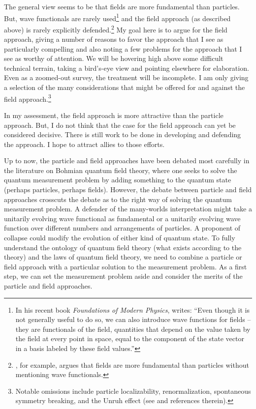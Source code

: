 \documentclass[12pt,onecolumn,secnumarabic,amsmath,amssymb,balancelastpage,nofootinbib]{article}
\begin{document}
The general view seems to be that fields are more fundamental than particles.  But, wave functionals are rarely used\footnote{In his recent book \emph{Foundations of Modern Physics}, \citet[pg.\ 251--252]{weinberg2021} writes: ``Even though it is not generally useful to do so, we can also introduce wave functions for fields -- they are functionals of the field, quantities that depend on the value taken by the field at every point in space, equal to the component of the state vector in a basis labeled by these field values.''} and the field approach (as described above) is rarely explicitly defended.\footnote{\citet{hobson2013}, for example, argues that fields are more fundamental than particles without mentioning wave functionals.}  My goal here is to argue for the field approach, giving a number of reasons to favor the approach that I see as particularly compelling and also noting a few problems for the approach that I see as worthy of attention.  We will be hovering high above some difficult technical terrain, taking a bird's-eye view and pointing elsewhere for elaboration.  Even as a zoomed-out survey, the treatment will be incomplete.  I am only giving a selection of the many considerations that might be offered for and against the field approach.\footnote{Notable omissions include particle localizability, renormalization, spontaneous symmetry breaking, and the Unruh effect (see \citealp{barrett2002, lupher2010, earman2011unruh, ruetsche2011, myrvold2015, baker2016, wallace2021, wallace2022} and references therein).}

In my assessment, the field approach is more attractive than the particle approach.  But, I do not think that the case for the field approach can yet be considered decisive.  There is still work to be done in developing and defending the approach.  I hope to attract allies to those efforts.

Up to now, the particle and field approaches have been debated most carefully in the literature on Bohmian quantum field theory, where one seeks to solve the quantum measurement problem by adding something to the quantum state (perhaps particles, perhaps fields).  However, the debate between particle and field approaches crosscuts the debate as to the right way of solving the quantum measurement problem.  A defender of the many-worlds interpretation might take a unitarily evolving wave functional as fundamental or a unitarily evolving wave function over different numbers and arrangements of particles.  A proponent of collapse could modify the evolution of either kind of quantum state.  To fully understand the ontology of quantum field theory (what exists according to the theory) and the laws of quantum field theory, we need to combine a particle or field approach with a particular solution to the measurement problem.  As a first step, we can set the measurement problem aside and consider the merits of the particle and field approaches.
\end{document}
